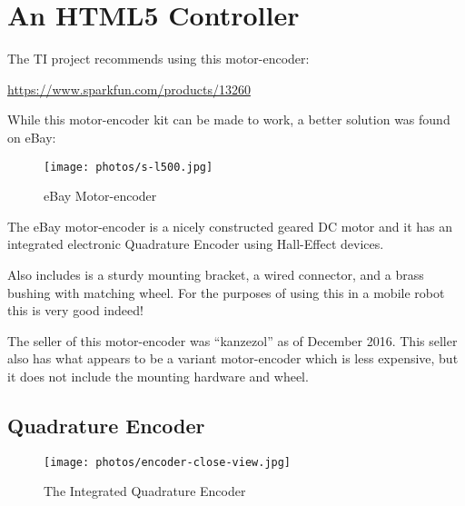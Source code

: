 %
%
%

\chapter{An HTML5 Controller}

The TI project recommends using this motor-encoder:

\url{https://www.sparkfun.com/products/13260}

While this motor-encoder kit can be made to work, a better solution was found on eBay:

\begin{figure}[h]
	\centering
    \texttt{[image: photos/s-l500.jpg]}
	\centering\bfseries
	\caption{eBay Motor-encoder}
\end{figure}

The eBay motor-encoder is a nicely constructed geared DC motor and it has an integrated electronic Quadrature Encoder using Hall-Effect devices.

Also includes is a sturdy mounting bracket, a wired connector, and a brass bushing with matching wheel.  For the purposes of using this in a mobile robot this is very good indeed!

The seller of this motor-encoder was ``kanzezol'' as of December 2016.  This seller also has what appears to be a variant motor-encoder which is less expensive, but it does not include the mounting hardware and wheel.

\section{Quadrature Encoder}

\begin{figure}[h]
	\centering
    \texttt{[image: photos/encoder-close-view.jpg]}
	\centering\bfseries
	\caption{The Integrated Quadrature Encoder}
\end{figure}

